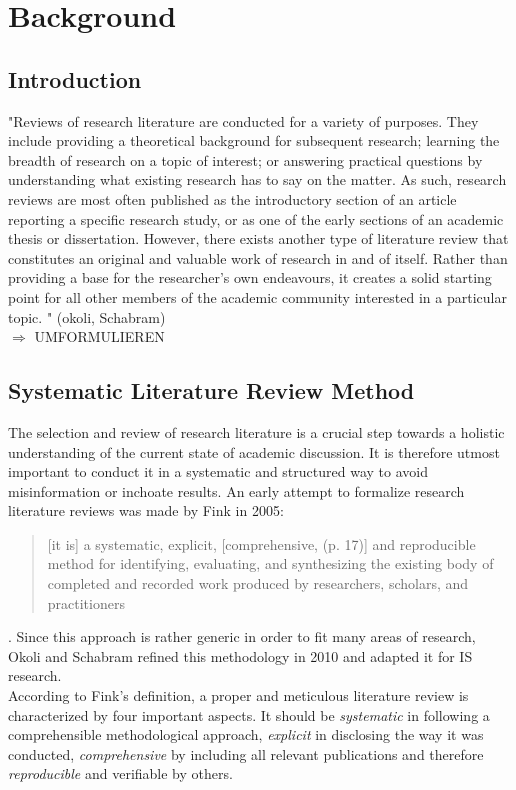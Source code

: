 \chapter{Background}


\section{Introduction}

"Reviews of research literature are conducted for a variety of purposes. They include
providing a theoretical background for subsequent research; learning the breadth of research on a
topic of interest; or answering practical questions by understanding what existing research has to
say on the matter. As such, research reviews are most often published as the introductory section
of an article reporting a specific research study, or as one of the early sections of an academic
thesis or dissertation. However, there exists another type of literature review that constitutes an
original and valuable work of research in and of itself. Rather than providing a base for the
researcher’s own endeavours, it creates a solid starting point for all other members of the
academic community interested in a particular topic. " (okoli, Schabram)\\
$\Longrightarrow$ UMFORMULIEREN
\clearpage
\section{Systematic Literature Review Method}\label{sec:LitRes}

The selection and review of research literature is a crucial step towards a holistic understanding of the current state of academic discussion. It is therefore utmost important to conduct it in a systematic and structured way to avoid misinformation or inchoate results. An early attempt to formalize research literature reviews was made by Fink in 2005: \blockquote{[it is] a systematic, explicit,
[comprehensive, (p. 17)] and reproducible method for identifying, evaluating, and synthesizing
the existing body of completed and recorded work produced by researchers, scholars, and
practitioners}\autocite{Fink2015ConductingPaper}. Since this approach is rather generic in order to fit many areas of research, Okoli and Schabram refined this methodology in 2010 and adapted it for \acf{IS} research. \\
According to Fink's definition, a proper and meticulous literature review is characterized by four important aspects. It should be \textit{systematic} in following a comprehensible methodological approach, \textit{explicit} in disclosing the way it was conducted, \textit{comprehensive} by including all relevant publications and therefore \textit{reproducible} and verifiable by others. 

